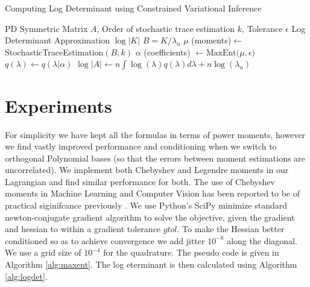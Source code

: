 \documentclass[letterpaper]{article} %
\begin{document}
\begin{algorithm}
	\caption{Computing Log Determinant using Constrained Variational Inference}\label{alg:logdet}
	\begin{algorithmic}[1]
		\vspace{0.5em}
		 PD Symmetric Matrix $A$, Order of stochastic trace estimation $k$, Tolerance $\epsilon$
		 Log Determinant Approximation $\log|K|$
		\STATE $B = K/\lambda_{u}$
		\STATE $\mu$ (moments)$ \gets$ StochasticTraceEstimation$(B, k)$ 
		\STATE $\alpha$ (coefficients) $\gets \text{MaxEnt(}\mu, \epsilon)$
		\STATE $q(\lambda) \gets q(\lambda | \alpha)$
		\STATE $\log|A| \gets n\int \log(\lambda) q(\lambda) d\lambda + n\log(\lambda_{u})$
	\end{algorithmic}
\end{algorithm}

\section{Experiments}
\label{experiments}
For simplicity we have kept all the formulas in terms of power moments, however we find vastly improved performance and conditioning when we switch to orthogonal Polynomial bases (so that the errors between moment estimations are uncorrelated). We implement both Chebyshev and Legendre moments in our Lagrangian and find similar performance for both. The use of Chebyshev moments in Machine Learning and Computer Vision has been reported to be of practical siginifcance previously \cite{yap2001chebyshev}. We use Python's SciPy minimize standard newton-conjugate gradient algorithm to solve the objective, given the gradient and hessian to within a gradient tolerance $gtol$. To make the Hessian better conditioned so as to achieve convergence we add jitter $10^{-8}$ along the diagonal. We use a grid size of $10^{-4}$ for the quadrature. The pseudo code is given in Algorithm \ref{alg:maxent}. The log eterminant is then calculated using Algorithm \ref{alg:logdet}.
\end{document}
